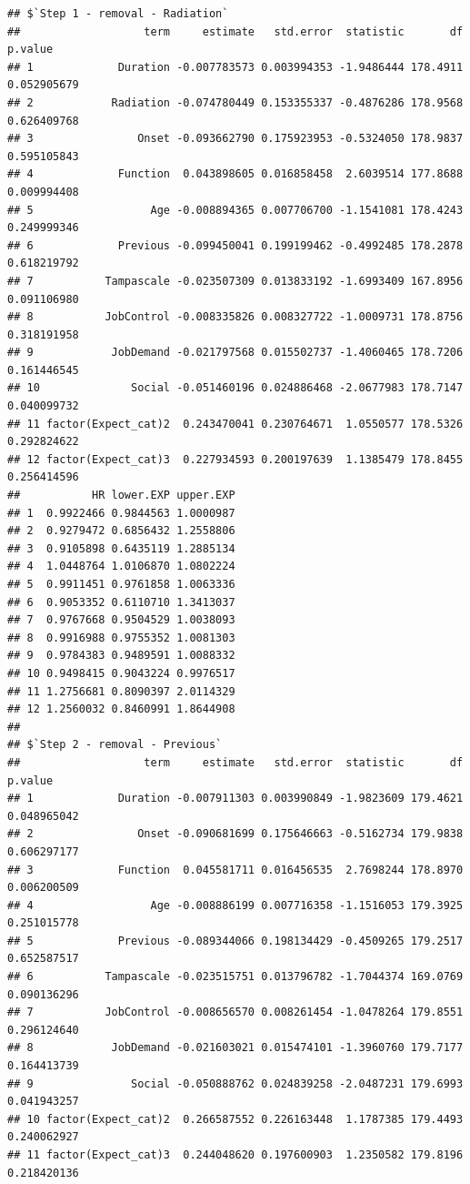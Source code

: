 \documentclass[
]{book}
\begin{document}
\begin{verbatim}
## $`Step 1 - removal - Radiation`
##                   term     estimate   std.error  statistic       df     p.value
## 1             Duration -0.007783573 0.003994353 -1.9486444 178.4911 0.052905679
## 2            Radiation -0.074780449 0.153355337 -0.4876286 178.9568 0.626409768
## 3                Onset -0.093662790 0.175923953 -0.5324050 178.9837 0.595105843
## 4             Function  0.043898605 0.016858458  2.6039514 177.8688 0.009994408
## 5                  Age -0.008894365 0.007706700 -1.1541081 178.4243 0.249999346
## 6             Previous -0.099450041 0.199199462 -0.4992485 178.2878 0.618219792
## 7           Tampascale -0.023507309 0.013833192 -1.6993409 167.8956 0.091106980
## 8           JobControl -0.008335826 0.008327722 -1.0009731 178.8756 0.318191958
## 9            JobDemand -0.021797568 0.015502737 -1.4060465 178.7206 0.161446545
## 10              Social -0.051460196 0.024886468 -2.0677983 178.7147 0.040099732
## 11 factor(Expect_cat)2  0.243470041 0.230764671  1.0550577 178.5326 0.292824622
## 12 factor(Expect_cat)3  0.227934593 0.200197639  1.1385479 178.8455 0.256414596
##           HR lower.EXP upper.EXP
## 1  0.9922466 0.9844563 1.0000987
## 2  0.9279472 0.6856432 1.2558806
## 3  0.9105898 0.6435119 1.2885134
## 4  1.0448764 1.0106870 1.0802224
## 5  0.9911451 0.9761858 1.0063336
## 6  0.9053352 0.6110710 1.3413037
## 7  0.9767668 0.9504529 1.0038093
## 8  0.9916988 0.9755352 1.0081303
## 9  0.9784383 0.9489591 1.0088332
## 10 0.9498415 0.9043224 0.9976517
## 11 1.2756681 0.8090397 2.0114329
## 12 1.2560032 0.8460991 1.8644908
## 
## $`Step 2 - removal - Previous`
##                   term     estimate   std.error  statistic       df     p.value
## 1             Duration -0.007911303 0.003990849 -1.9823609 179.4621 0.048965042
## 2                Onset -0.090681699 0.175646663 -0.5162734 179.9838 0.606297177
## 3             Function  0.045581711 0.016456535  2.7698244 178.8970 0.006200509
## 4                  Age -0.008886199 0.007716358 -1.1516053 179.3925 0.251015778
## 5             Previous -0.089344066 0.198134429 -0.4509265 179.2517 0.652587517
## 6           Tampascale -0.023515751 0.013796782 -1.7044374 169.0769 0.090136296
## 7           JobControl -0.008656570 0.008261454 -1.0478264 179.8551 0.296124640
## 8            JobDemand -0.021603021 0.015474101 -1.3960760 179.7177 0.164413739
## 9               Social -0.050888762 0.024839258 -2.0487231 179.6993 0.041943257
## 10 factor(Expect_cat)2  0.266587552 0.226163448  1.1787385 179.4493 0.240062927
## 11 factor(Expect_cat)3  0.244048620 0.197600903  1.2350582 179.8196 0.218420136

\end{verbatim}
\end{document}
